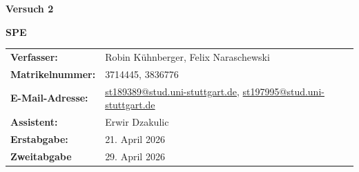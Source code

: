 \documentclass[12pt]{scrartcl} %
\begin{document}
\begin{titlepage}
  \begin{center}
    \vspace*{2cm}
    \begin{LARGE}
      \vspace*{1cm}
      \textbf{\textsf{Versuch 2 \\}}
    \end{LARGE}
    \vspace*{1cm}
    \textbf{\textsf{SPE}}\\
    \vspace*{1.5cm}
    \begin{table}[H]
      \sffamily
      \hspace*{3cm}
      \begin{tabular}{>{\bfseries}p{4cm}p{8cm}}
        Verfasser:      & Robin Kühnberger, Felix Naraschewski                                                                                                                       \\
        Matrikelnummer: & 3714445, 3836776                                                                                                                                           \\
        E-Mail-Adresse: & \href{mailto:st189389@stud.uni-stuttgart.de}{st189389@stud.uni-stuttgart.de}, \href{mailto:st197995@stud.uni-stuttgart.de}{st197995@stud.uni-stuttgart.de} \\
        Assistent:      & Erwir Dzakulic                                                                                                                                             \\
        Erstabgabe:     & 21. April 2026                                                                                                                                                     \\
        Zweitabgabe     & 29. April 2026                                                                                                                                                           \\
      \end{tabular}
    \end{table}
  \end{center}
\end{titlepage}
\pagestyle{empty}        %
\tableofcontents
\clearpage               %
\pagestyle{scrheadings}  %





\newpage
{}

\printbibliography
\end{document}

